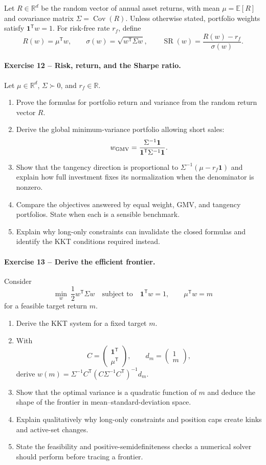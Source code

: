 \documentclass[10pt]{article}
\newcommand{\R}{\mathbb{R}}
\newcommand{\E}{\mathbb{E}}
\newcommand{\Cov}{\operatorname{Cov}}
\newcommand{\trans}{^{\mathsf T}}
\begin{document}
Let $R\in\R^d$ be the random vector of annual asset returns, with
mean $\mu=\E[R]$ and covariance matrix $\Sigma=\Cov(R)$. Unless otherwise
stated, portfolio weights satisfy $\mathbf1\trans w=1$. For risk-free rate
$r_f$, define
\[
R(w)=\mu\trans w,
\qquad \sigma(w)=\sqrt{w\trans\Sigma w},
\qquad \operatorname{SR}(w)=\frac{R(w)-r_f}{\sigma(w)}.
\]

\paragraph{Exercise 12 -- Risk, return, and the Sharpe ratio.}
Let $\mu\in\R^d$, $\Sigma\succ0$, and $r_f\in\R$.
\begin{enumerate}
\item Prove the formulas for portfolio return and variance from the random
return vector $R$.
\item Derive the global minimum-variance portfolio allowing short sales:
\[
w_{\rm GMV}=\frac{\Sigma^{-1}\mathbf1}
{\mathbf1\trans\Sigma^{-1}\mathbf1}.
\]
\item Show that the tangency direction is proportional to
$\Sigma^{-1}(\mu-r_f\mathbf1)$ and explain how full investment fixes its
normalization when the denominator is nonzero.
\item Compare the objectives answered by equal weight, GMV, and tangency
portfolios. State when each is a sensible benchmark.
\item Explain why long-only constraints can invalidate the closed formulas
and identify the KKT conditions required instead.
\end{enumerate}

\paragraph{Exercise 13 -- Derive the efficient frontier.}
Consider
\[
\min_w\ \frac12w\trans\Sigma w
\quad\text{subject to}\quad
\mathbf1\trans w=1,\qquad \mu\trans w=m
\]
for a feasible target return $m$.
\begin{enumerate}
\item Derive the KKT system for a fixed target $m$.
\item With
\[
C=\begin{pmatrix}\mathbf1\trans\\\mu\trans\end{pmatrix},
\qquad d_m=\begin{pmatrix}1\\m\end{pmatrix},
\]
derive
$w(m)=\Sigma^{-1}C\trans(C\Sigma^{-1}C\trans)^{-1}d_m$.
\item Show that the optimal variance is a quadratic function of $m$ and
deduce the shape of the frontier in mean--standard-deviation space.
\item Explain qualitatively why long-only constraints and position caps create
kinks and active-set changes.
\item State the feasibility and positive-semidefiniteness checks a numerical
solver should perform before tracing a frontier.
\end{enumerate}
\end{document}
